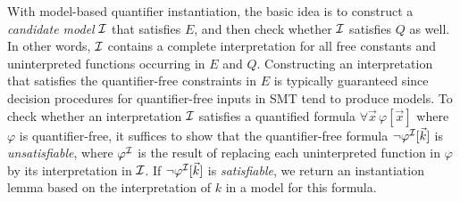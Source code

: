 \documentclass{easychair}
\begin{document}
With model-based quantifier instantiation, the basic idea is
to construct a \emph{candidate model} $\mathcal{I}$ that satisfies $E$, 
and then check whether $\mathcal{I}$ satisfies $Q$ as well.
In other words, $\mathcal{I}$ contains a complete interpretation for all free constants and uninterpreted functions occurring in $E$ and $Q$.
Constructing an interpretation that satisfies the quantifier-free constraints in $E$
is typically guaranteed since decision procedures for quantifier-free inputs in SMT tend to produce models.
To check whether an interpretation $\mathcal{I}$ satisfies a quantified formula $\forall \vec x\, \varphi[ \vec x ]$ where $\varphi$ is quantifier-free,
it suffices to show that the quantifier-free formula $\neg \varphi^{\mathcal{I}}[ \vec k ]$ is \emph{unsatisfiable},
where $\varphi^{\mathcal{I}}$ is the result of replacing each uninterpreted function in $\varphi$
by its interpretation in $\mathcal{I}$.
If $\neg \varphi^{\mathcal{I}}[ \vec k ]$ is \emph{satisfiable}, we return an instantiation lemma based on the interpretation of $k$ in a model
for this formula.
\end{document}
